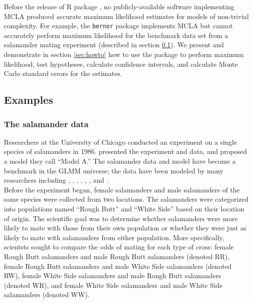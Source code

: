 \documentclass[article]{jss}
\begin{document}
Before the release of R package , no publicly-available software  implementing MCLA  produced accurate maximum likelihood estimates for models of non-trivial complexity. For example, the \texttt{bernor}  package \citep{sung:geyer:2007} implements MCLA but cannot accurately perform maximum likelihood for the benchmark data set from a salamander mating experiment (described in section \ref{sec:examples}). 
We present     and demonstrate in section \ref{sec:howto} how to use the package to perform maximum likelihood, test hypotheses, calculate confidence intervals, and calculate Monte Carlo standard errors for the estimates.  


\subsection{Examples}\label{sec:examples}

\subsubsection{The salamander data}

Researchers at the University of Chicago conducted an experiment on a single species of salamanders  in 1986.
 \citet[Section 14.5]{mcc:nelder:1989} presented the experiment and data, and \citet{karim:zeger:1992} proposed a model they call ``Model A.'' The salamander data and model have become a benchmark in the GLMM universe;  the data have been modeled by many researchers including \citet{booth:hobert:1999},  \citet{bres:clay:1993},   \citet{karim:zeger:1992}, \citet{mcc:nelder:1989},  \citet{schall:1991},  \citet{sung:geyer:2007}, and \citet{wolfinger:oconnell:1993}.\\




Before the experiment began, female salamanders and male salamanders of the same species were collected from two locations. The salamanders were categorized into populations named ``Rough Butt'' and ``White Side'' based on their location of origin. The scientific goal was to determine whether salamanders were more likely to mate with those from their own population or whether they were just as likely to mate with salamanders from either population. More specifically, scientsts sought to compare the odds of mating for each type of  cross: female Rough Butt salamanders and male Rough Butt salamanders (denoted RR), female Rough Butt salamanders and male White Side salamanders (denoted RW), female White Side salamanders and male Rough Butt salamanders (denoted WR), and female White Side salamanders and male White Side salamanders (denoted WW).    \\
\end{document}
